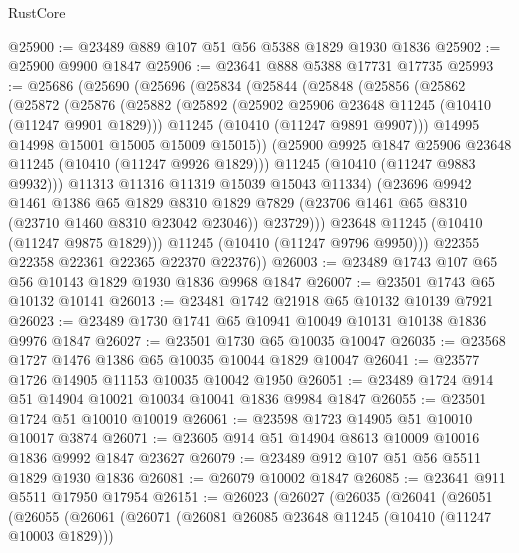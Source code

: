 \begin{lexlean}{RustCore}
\begin{coremodule}
@25900 := @23489 @889 @107 @51 @56 @5388 @1829 @1930 @1836
@25902 := @25900 @9900 @1847
@25906 := @23641 @888 @5388 @17731 @17735
@25993 := @25686
    (@25690
      (@25696
        (@25834
          (@25844
            (@25848
              (@25856
                (@25862
                  (@25872
                    (@25876
                      (@25882
                        (@25892
                          (@25902 @25906 @23648 @11245 (@10410 (@11247 @9901 @1829)))
                          @11245
                          (@10410 (@11247 @9891 @9907)))
                        @14995
                        @14998
                        @15001
                        @15005
                        @15009
                        @15015))
                    (@25900 @9925 @1847 @25906 @23648 @11245 (@10410 (@11247 @9926 @1829)))
                    @11245
                    (@10410 (@11247 @9883 @9932)))
                  @11313
                  @11316
                  @11319
                  @15039
                  @15043
                  @11334)
                (@23696
                  @9942
                  @1461
                  @1386
                  @65
                  @1829
                  @8310
                  @1829
                  @7829
                  (@23706 @1461 @65 @8310 (@23710 @1460 @8310 @23042 @23046))
                  @23729)))
            @23648
            @11245
            (@10410 (@11247 @9875 @1829)))
          @11245
          (@10410 (@11247 @9796 @9950)))
        @22355
        @22358
        @22361
        @22365
        @22370
        @22376))
@26003 := @23489 @1743 @107 @65 @56 @10143 @1829 @1930 @1836 @9968 @1847
@26007 := @23501 @1743 @65 @10132 @10141
@26013 := @23481 @1742 @21918 @65 @10132 @10139 @7921
@26023 := @23489 @1730 @1741 @65 @10941 @10049 @10131 @10138 @1836 @9976 @1847
@26027 := @23501 @1730 @65 @10035 @10047
@26035 := @23568 @1727 @1476 @1386 @65 @10035 @10044 @1829 @10047
@26041 := @23577 @1726 @14905 @11153 @10035 @10042 @1950
@26051 := @23489 @1724 @914 @51 @14904 @10021 @10034 @10041 @1836 @9984 @1847
@26055 := @23501 @1724 @51 @10010 @10019
@26061 := @23598 @1723 @14905 @51 @10010 @10017 @3874
@26071 := @23605 @914 @51 @14904 @8613 @10009 @10016 @1836 @9992 @1847 @23627
@26079 := @23489 @912 @107 @51 @56 @5511 @1829 @1930 @1836
@26081 := @26079 @10002 @1847
@26085 := @23641 @911 @5511 @17950 @17954
@26151 := @26023
    (@26027
      (@26035
        (@26041
          (@26051
            (@26055
              (@26061
                (@26071
                  (@26081 @26085 @23648 @11245 (@10410 (@11247 @10003 @1829)))

\end{coremodule}
\end{lexlean}
